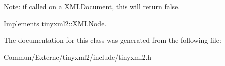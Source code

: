 Note\+: if called on a \hyperlink{classtinyxml2_1_1_x_m_l_document}{X\+M\+L\+Document}, this will return false. 

Implements \hyperlink{classtinyxml2_1_1_x_m_l_node_ac50408e91e095237f45716092ac2bddc}{tinyxml2\+::\+X\+M\+L\+Node}.



The documentation for this class was generated from the following file\+:\begin{DoxyCompactItemize}
\item 
Commun/\+Externe/tinyxml2/include/tinyxml2.\+h\end{DoxyCompactItemize}

